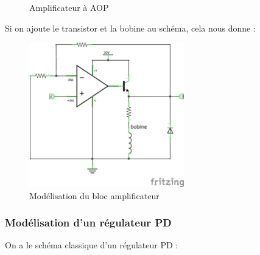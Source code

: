 \documentclass[11pt,a4paper]{article}
\begin{document}
\begin{figure} [H]
\begin{center}
\end{center}
\caption{Amplificateur à AOP}
\label{fig:Amplificateur à AOP}
\end{figure}

Si on ajoute le transistor et la bobine au schéma, cela nous donne :
\begin{figure} [H]
\begin{center}
\includegraphics[width=0.6\textwidth]{Schémas/Ampli.png} 
\end{center}
\caption{Modélisation du bloc amplificateur}
\label{fig:Modélisation du bloc amplificateur}
\end{figure}

\subsubsection{Modélisation d'un régulateur PD}
\label{Modélisation PD}
On a le schéma classique d'un régulateur PD :
\end{document}
